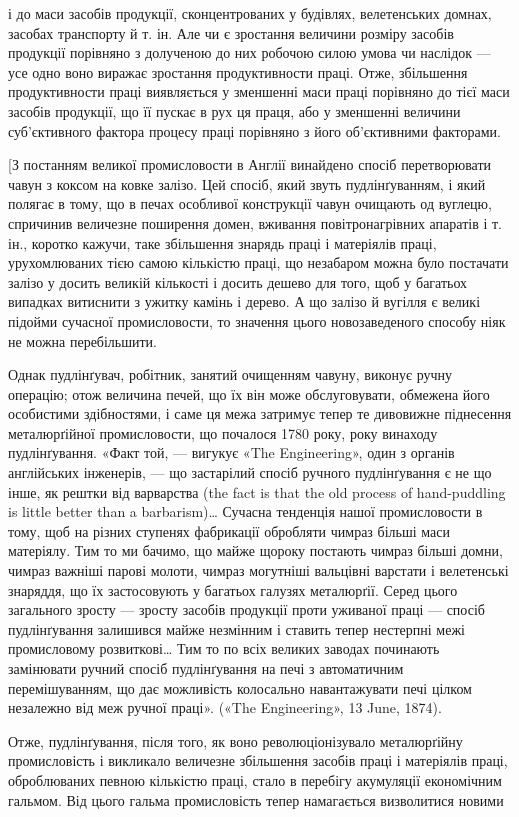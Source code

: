 \parcont{}  %
і до маси засобів продукції, сконцентрованих у будівлях, велетенських
домнах, засобах транспорту й т. ін. Але чи є зростання
величини розміру засобів продукції порівняно з долученою до
них робочою силою умова чи наслідок — усе одно воно виражає
зростання продуктивности праці. Отже, збільшення продуктивности
праці виявляється у зменшенні маси праці порівняно до
тієї маси засобів продукції, що її пускає в рух ця праця, або у
зменшенні величини суб’єктивного фактора процесу праці порівняно
з його об’єктивними факторами.

[З постанням великої промисловости в Англії винайдено
спосіб перетворювати чавун з коксом на ковке залізо. Цей
спосіб, який звуть пудлінґуванням, і який полягає в тому, що
в печах особливої конструкції чавун очищають од вуглецю,
спричинив величезне поширення домен, вживання повітронагрівних
апаратів і т. ін., коротко кажучи, таке збільшення знарядь
праці і матеріялів праці, урухомлюваних тією самою кількістю
праці, що незабаром можна було постачати залізо у досить великій
кількості і досить дешево для того, щоб у багатьох випадках
витиснити з ужитку камінь і дерево. А що залізо й вугілля є
великі підойми сучасної промисловости, то значення цього новозаведеного
способу ніяк не можна перебільшити.

Однак пудлінґувач, робітник, занятий очищенням чавуну,
виконує ручну операцію; отож величина печей, що їх він може
обслуговувати, обмежена його особистими здібностями, і саме
ця межа затримує тепер те дивовижне піднесення металюрґійної
промисловости, що почалося 1780 року, року винаходу пудлінґування.
«Факт той, — вигукує «The Engineering», один з органів
англійських інженерів, — що застарілий спосіб ручного пудлінґування
є не що інше, як рештки від варварства (the fact is that the old
process of hand-puddling is little better than a barbarism)\dots{}
Сучасна тенденція нашої промисловости в тому, щоб на різних
ступенях фабрикації обробляти чимраз більші маси матеріялу.
Тим то ми бачимо, що майже щороку постають чимраз
більші домни, чимраз важніші парові молоти, чимраз могутніші
вальцівні варстати і велетенські знаряддя, що їх застосовують
у багатьох галузях металюрґії. Серед цього загального зросту —
зросту засобів продукції проти уживаної праці — спосіб пудлінґування
залишився майже незмінним і ставить тепер нестерпні
межі промисловому розвиткові\dots{} Тим то по всіх великих заводах
починають замінювати ручний спосіб пудлінґування на
печі з автоматичним перемішуванням, що дає можливість колосально
навантажувати печі цілком незалежно від меж ручної
праці». («The Engineering», 13 June, 1874).

Отже, пудлінґування, після того, як воно революціонізувало
металюрґійну промисловість і викликало величезне збільшення
засобів праці і матеріялів праці, оброблюваних певною кількістю
праці, стало в перебігу акумуляції економічним гальмом. Від
цього гальма промисловість тепер намагається визволитися новими
\parbreak{}  %
